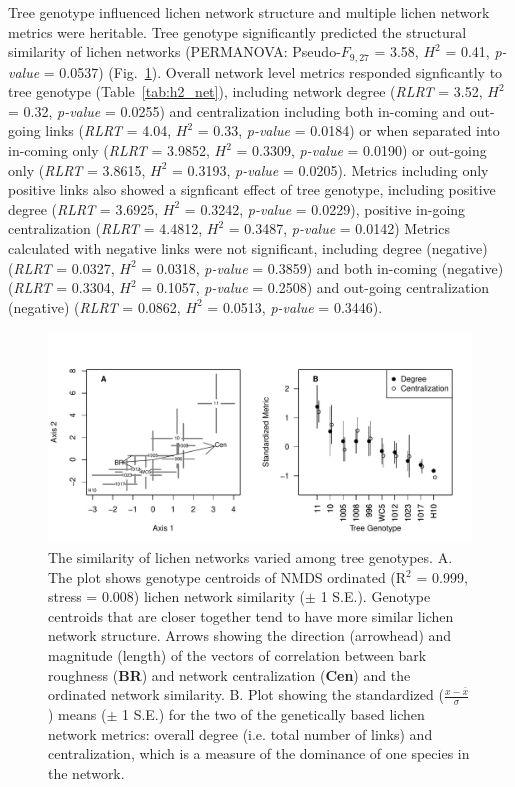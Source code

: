 \documentclass[11pt,twocolumn,twoside,lineno]{pnas-new}
\begin{document}

Tree genotype influenced lichen network structure and multiple lichen
network metrics were heritable.  Tree genotype significantly predicted
the structural similarity of lichen networks (PERMANOVA:
Pseudo-$F_{9,27}$ = 3.58, $H^2$ = 0.41, \textit{p-value} = 0.0537)
(Fig.~\ref{fig:h2_plot}).  Overall network level metrics responded
signficantly to tree genotype (Table~\ref{tab:h2_net}), including
network degree (\textit{RLRT} = 3.52, $H^2$ = 0.32, \textit{p-value} =
0.0255) and centralization including both in-coming and out-going
links (\textit{RLRT} = 4.04, $H^2$ = 0.33, \textit{p-value} = 0.0184)
or when separated into in-coming only (\textit{RLRT} = 3.9852, $H^2$ =
0.3309, \textit{p-value} = 0.0190) or out-going only (\textit{RLRT} =
3.8615, $H^2$ = 0.3193, \textit{p-value} = 0.0205).  Metrics including
only positive links also showed a signficant effect of tree genotype,
including positive degree (\textit{RLRT} = 3.6925, $H^2$ = 0.3242,
\textit{p-value} = 0.0229), positive in-going centralization
(\textit{RLRT} = 4.4812, $H^2$ = 0.3487, \textit{p-value} = 0.0142)
Metrics calculated with negative links were not significant, including
degree (negative) (\textit{RLRT} = 0.0327, $H^2$ = 0.0318,
\textit{p-value} = 0.3859) and both in-coming (negative)
(\textit{RLRT} = 0.3304, $H^2$ = 0.1057, \textit{p-value} = 0.2508)
and out-going centralization (negative) (\textit{RLRT} = 0.0862, $H^2$
= 0.0513, \textit{p-value} = 0.3446).

\begin{figure}[ht]
\centering
\includegraphics[width=\linewidth]{h2_plot.pdf}
\caption{The similarity of lichen networks varied among tree
  genotypes. A. The plot shows genotype centroids of NMDS ordinated
  (R$^2$ = 0.999, stress = 0.008) lichen network similarity ($\pm$ 1
  S.E.). Genotype centroids that are closer together tend to have more
  similar lichen network structure. Arrows showing the direction
  (arrowhead) and magnitude (length) of the vectors of correlation
  between bark roughness (\textbf{BR}) and network centralization
  (\textbf{Cen}) and the ordinated network similarity. B. Plot showing
  the standardized ($\frac{x - \bar{x}}{\sigma}$) means ($\pm$ 1 S.E.)
  for the two of the genetically based lichen network metrics: overall
  degree (i.e. total number of links) and centralization, which is a
  measure of the dominance of one species in the network.}
\label{fig:h2_plot}
\end{figure}
\end{document}
